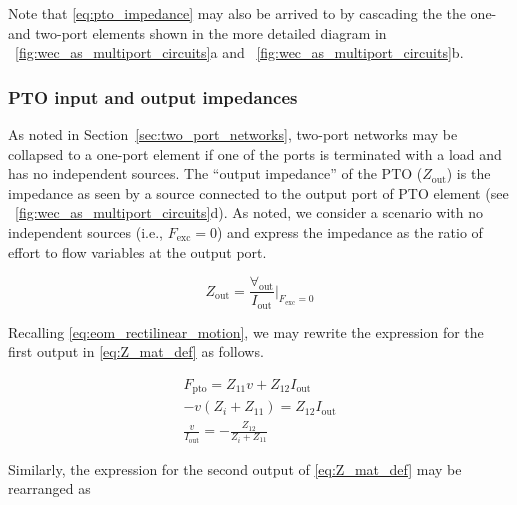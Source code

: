 \documentclass[lettersize,journal]{IEEEtran}
\begin{document}
 \noindent{}Note that \eqref{eq:pto_impedance} may also be arrived to by cascading the the one- and two-port elements shown in the more detailed diagram in \figurename~\ref{fig:wec_as_multiport_circuits}a and \figurename~\ref{fig:wec_as_multiport_circuits}b.


\subsubsection{PTO input and output impedances}\label{sec:pto_input_and_output_impedances}

As noted in Section~\ref{sec:two_port_networks}, two-port networks may be collapsed to a one-port element if one of the ports is terminated with a load and has no independent sources.
The ``output impedance'' of the PTO ($Z_{\textrm{out}}$) is the impedance as seen by a source connected to the output port of PTO element (see \figurename~\ref{fig:wec_as_multiport_circuits}d).
As noted, we consider a scenario with no independent sources (i.e., $F_{\textrm{exc}} = 0$) and express the impedance as the ratio of effort to flow variables at the output port.

\begin{equation}
        Z_{\textrm{out}} = \frac{\forall_{\textrm{out}}}{I_{\textrm{out}}} \bigg\vert_{F_{\textrm{exc}}=0}
        \label{eq:Zout_1}
\end{equation}

\noindent{}Recalling \eqref{eq:eom_rectilinear_motion}, we may rewrite the expression for the first output in \eqref{eq:Z_mat_def} as follows.

\begin{subequations}
        \begin{align}
                F_{\textrm{pto}} = Z_{11} v + Z_{12} I_{\textrm{out}} \label{eq:Zout_Fpto_1} \\[0.5em]
                -v (Z_i + Z_{11}) = Z_{12} I_{\textrm{out}} \label{eq:Zout_Fpto_2} \\[0.5em]
                \frac{v}{I_{\textrm{out}}} = -\frac{Z_{12}}{Z_i + Z_{11}} \label{eq:Zout_Fpto_3}
        \end{align}
        \label{eq:Zout_Fpto}
\end{subequations}

\noindent{}Similarly, the expression for the second output of \eqref{eq:Z_mat_def} may be rearranged as
\end{document}
